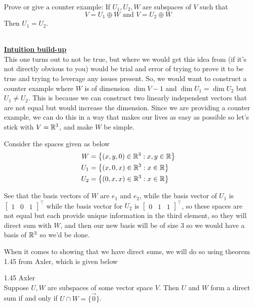 \documentclass[answers]{exam}
\begin{document}
\begin{questions}
    \question Prove or give a counter example: If $U_1,U_2,W$ are subspaces of $V$ such that
    \[
        V = U_1\oplus W \text{ and } V = U_2\oplus W
    \]
    Then $U_1 = U_2$.

    \begin{solution}\,\\
        \underline{\textbf{Intuition build-up}}\\
        This one turns out to not be true, but where we would get this idea from (if it's not directly obvious to you) would be trial and error
        of trying to prove it to be true and trying to leverage any issues present. So, we would want to construct
        a counter example where $W$ is of dimension $\dim{V} -1$ and $\dim{U_1} = \dim{U_2}$ but $U_1\neq U_2$.
        This is because we can construct two linearly independent vectors that are not equal but would increase the dimension. 
        Since we are providing a counter example, we can do this in a way that makes our lives as easy as possible
        so let's stick with $V=\mathbb{R}^3$, and make $W$ be simple.

        Consider the spaces given as below
        \begin{align*}
            W &= \left\{(x,y,0)\in\mathbb{R}^3 : x,y\in\mathbb{R}\right\}\\
            U_1 &= \left\{(x,0,x)\in\mathbb{R}^3 : x\in\mathbb{R}\right\}\\
            U_2 &= \left\{(0,x,x)\in\mathbb{R}^3 : x\in\mathbb{R}\right\}
        \end{align*}

        See that the basis vectors of $W$ are $e_1$ and $e_2$, while the basis vector of $U_1$ is $\begin{bmatrix}1&0&1\end{bmatrix}^\top$ while the basis vector for $U_2$ is $\begin{bmatrix}0&1&1\end{bmatrix}^\top$, so these spaces are not equal but each provide unique information in the third element, so they will direct sum with $W$, and then our new basis will be of size $3$ so we would have a basis of $\mathbb{R}^3$ so we'd be done.

            When it comes to showing that we have direct sums, we will do so using theorem 1.45 from Axler, which
            is given below
            \begin{theorem}\label{thm:Axler145} 1.45 Axler\\
                Suppose $U,W$ are subspaces of some vector space $V$. Then $U$ and $W$ form a direct sum if and 
                only if $U\cap W = \{\vec{0}\}$.
            \end{theorem}
        

\end{solution}
\end{questions}
\end{document}
